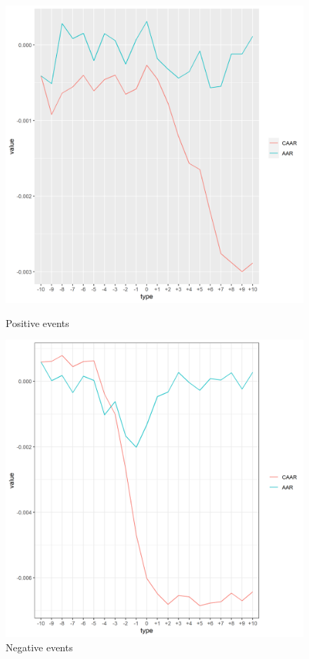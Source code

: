 \begin{figure}[!tbp]
  \begin{minipage}[b]{0.45\textwidth}
    \includegraphics[scale=0.45]{Projekt/1.Figures analysis/ST_positive_all.png}
    \caption{Positive events}
  \end{minipage}
  \hfill
  \begin{minipage}[b]{0.45\textwidth}
    \includegraphics[scale=0.45]{Projekt/1.Figures analysis/ST_negative_all.png}
    \caption{Negative events}
  \end{minipage}

\end{figure}


